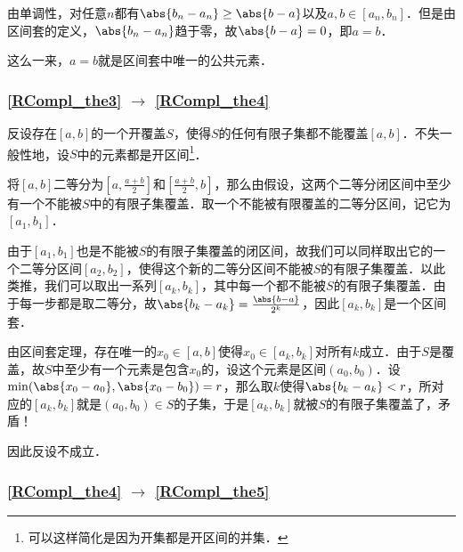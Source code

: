 由单调性，对任意$n$都有$\abs{b_n-a_n}\geq\abs{b-a}$以及$a, b\in [a_n, b_n]$．但是由区间套的定义，$\abs{b_n-a_n}$趋于零，故$\abs{b-a}=0$，即$a=b$．

这么一来，$a=b$就是区间套中唯一的公共元素．

\subsubsection{\autoref{RCompl_the3} $\to$ \autoref{RCompl_the4} }

反设存在$[a, b]$的一个开覆盖$S$，使得$S$的任何有限子集都不能覆盖$[a, b]$．不失一般性地，设$S$中的元素都是开区间\footnote{可以这样简化是因为开集都是开区间的并集．}．

将$[a, b]$二等分为$[a, \frac{a+b}{2}]$和$[\frac{a+b}{2}, b]$，那么由假设，这两个二等分闭区间中至少有一个不能被$S$中的有限子集覆盖．取一个不能被有限覆盖的二等分区间，记它为$[a_1, b_1]$．

由于$[a_1, b_1]$也是不能被$S$的有限子集覆盖的闭区间，故我们可以同样取出它的一个二等分区间$[a_2, b_2]$，使得这个新的二等分区间不能被$S$的有限子集覆盖．以此类推，我们可以取出一系列$[a_k, b_k]$，其中每一个都不能被$S$的有限子集覆盖．由于每一步都是取二等分，故$\abs{b_k-a_k}=\frac{\abs{b-a}}{2^k}$，因此$[a_k, b_k]$是一个区间套．

由区间套定理，存在唯一的$x_0\in[a, b]$使得$x_0\in[a_k, b_k]$对所有$k$成立．由于$S$是覆盖，故$S$中至少有一个元素是包含$x_0$的，设这个元素是区间$(a_0, b_0)$．设$\min(\abs{x_0-a_0}, \abs{x_0-b_0})=r$，那么取$k$使得$\abs{b_k-a_k}<r$，所对应的$[a_k, b_k]$就是$(a_0, b_0)\in S$的子集，于是$[a_k, b_k]$就被$S$的有限子集覆盖了，矛盾！

因此反设不成立．

\subsubsection{\autoref{RCompl_the4} $\to$ \autoref{RCompl_the5} }

















